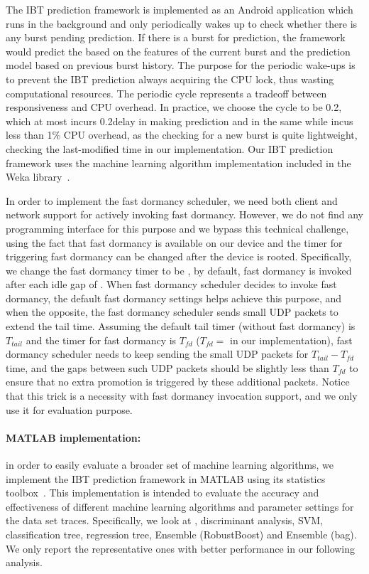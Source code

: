 The IBT prediction framework is implemented as an Android application which runs in the background and only periodically wakes up to check whether there is any burst pending prediction. If there is a burst for prediction, the framework would predict the \IBT based on the features of the current burst and the prediction model based on previous burst history. The purpose for the periodic wake-ups is to prevent the IBT prediction always acquiring the CPU lock, thus wasting computational resources. The periodic cycle represents a tradeoff between responsiveness and CPU overhead. In practice, we choose the cycle to be 0.2\BT, which at most incurs 0.2\BT delay in making prediction and in the same while incus less than 1\% CPU overhead, as the checking for a new burst is quite lightweight, \ie checking the last-modified time in our implementation. Our IBT prediction framework uses the machine learning algorithm implementation included in the Weka library~\cite{weka}.

In order to implement the fast dormancy scheduler, we need both client and network support for actively invoking fast dormancy. However, we do not find any programming interface for this purpose and we bypass this technical challenge, using the fact that fast dormancy is available on our device and the timer for triggering fast dormancy can be changed after the device is rooted. Specifically, we change the fast dormancy timer to be \BT, \ie by default, fast dormancy is invoked after each idle gap of \BT. When fast dormancy scheduler decides to invoke fast dormancy, the default fast dormancy settings helps achieve this purpose, and when the opposite, the fast dormancy scheduler sends small UDP packets to extend the tail time. Assuming the default tail timer (without fast dormancy) is $T_{tail}$ and the timer for fast dormancy is $T_{fd}$ ($T_{fd} =$ \BT in our implementation), fast dormancy scheduler needs to keep sending the small UDP packets for $T_{tail} - T_{fd}$ time, and the gaps between such UDP packets should be slightly less than $T_{fd}$ to ensure that no extra promotion is triggered by these additional packets. Notice that this trick is a necessity with fast dormancy invocation support, and we only use it for evaluation purpose.

\paragraph{MATLAB implementation:} in order to easily evaluate a broader set of machine learning algorithms, we implement the IBT prediction framework in MATLAB using its statistics toolbox~\cite{matlab.stats}. This implementation is intended to evaluate the accuracy and effectiveness of different machine learning algorithms and parameter settings for the \UMICH data set traces. Specifically, we look at \NB, discriminant analysis, SVM, classification tree, regression tree, Ensemble (RobustBoost) and Ensemble (bag). We only report the representative ones with better performance in our following analysis.

